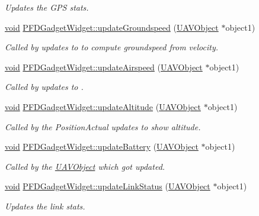 \begin{DoxyCompactItemize}
\begin{DoxyCompactList}\small\item\em Updates the G\-P\-S stats. \end{DoxyCompactList}\item 
\hyperlink{group___u_a_v_objects_plugin_ga444cf2ff3f0ecbe028adce838d373f5c}{void} \hyperlink{group___o_p_map_plugin_gafcdd8249475fe6543b75829cdc19b279}{P\-F\-D\-Gadget\-Widget\-::update\-Groundspeed} (\hyperlink{class_u_a_v_object}{U\-A\-V\-Object} $\ast$object1)
\begin{DoxyCompactList}\small\item\em Called by updates to  to compute groundspeed from velocity. \end{DoxyCompactList}\item 
\hyperlink{group___u_a_v_objects_plugin_ga444cf2ff3f0ecbe028adce838d373f5c}{void} \hyperlink{group___o_p_map_plugin_gac2bff4b3471fe9c088578d0d274716c6}{P\-F\-D\-Gadget\-Widget\-::update\-Airspeed} (\hyperlink{class_u_a_v_object}{U\-A\-V\-Object} $\ast$object1)
\begin{DoxyCompactList}\small\item\em Called by updates to . \end{DoxyCompactList}\item 
\hyperlink{group___u_a_v_objects_plugin_ga444cf2ff3f0ecbe028adce838d373f5c}{void} \hyperlink{group___o_p_map_plugin_ga2502b994bd991dec300fec210a41d06c}{P\-F\-D\-Gadget\-Widget\-::update\-Altitude} (\hyperlink{class_u_a_v_object}{U\-A\-V\-Object} $\ast$object1)
\begin{DoxyCompactList}\small\item\em Called by the Position\-Actual updates to show altitude. \end{DoxyCompactList}\item 
\hyperlink{group___u_a_v_objects_plugin_ga444cf2ff3f0ecbe028adce838d373f5c}{void} \hyperlink{group___o_p_map_plugin_ga098f60a9fd8da31477dcba4496d0f322}{P\-F\-D\-Gadget\-Widget\-::update\-Battery} (\hyperlink{class_u_a_v_object}{U\-A\-V\-Object} $\ast$object1)
\begin{DoxyCompactList}\small\item\em Called by the \hyperlink{class_u_a_v_object}{U\-A\-V\-Object} which got updated. \end{DoxyCompactList}\item 
\hyperlink{group___u_a_v_objects_plugin_ga444cf2ff3f0ecbe028adce838d373f5c}{void} \hyperlink{group___o_p_map_plugin_ga2ac4d982767aaefdeb40a4b506c57497}{P\-F\-D\-Gadget\-Widget\-::update\-Link\-Status} (\hyperlink{class_u_a_v_object}{U\-A\-V\-Object} $\ast$object1)
\begin{DoxyCompactList}\small\item\em Updates the link stats. \end{DoxyCompactList}\end{DoxyCompactItemize}
